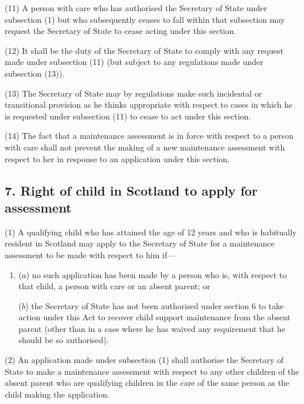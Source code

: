 \documentclass[12pt,a4paper]{article}
\begin{document}
(11) A person with care who has authorised the Secretary of State under subsection (1)  but who subsequently ceases to fall within that subsection may request the Secretary of State to cease acting under this section.

(12) It shall be the duty of the Secretary of State to comply with any request made under subsection (11)  (but subject to any regulations made under subsection (13)).

(13) The Secretary of State may by regulations make such incidental or transitional provision as he thinks appropriate with respect to cases in which he is requested under subsection (11)  to cease to act under this section.

(14) The fact that a maintenance assessment is in force with respect to a person with care shall not prevent the making of a new maintenance assessment with respect to her in response to an application under this section.


\subsection{7. Right of child in Scotland to apply for assessment}

(1) A qualifying child who has attained the age of 12 years and who is habitually resident in Scotland may apply to the Secretary of State for a maintenance assessment to be made with respect to him if—
\begin{enumerate}\item[]
($a$) no such application has been made by a person who is, with respect to that child, a person with care or an absent parent; or

($b$) the Secretary of State has not been authorised under section 6 to take action under this Act to recover child support maintenance from the absent parent (other than in a case where he has waived any requirement that he should be so authorised).
\end{enumerate}

(2) An application made under subsection (1)  shall authorise the Secretary of State to make a maintenance assessment with respect to any other children of the absent parent who are qualifying children in the care of the same person as the child making the application.
\end{document}
